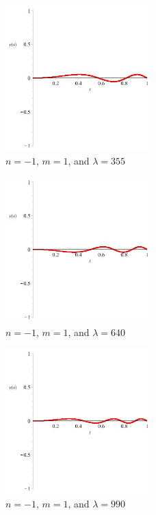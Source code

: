 \documentclass[executivepaper]{article}
\begin{document}
\begin{figure}[H]

\centering

\includegraphics[width=0.5\textwidth]{NEqualsNegative1MEquals1LambdaEquals355}

\caption{$n=-1$, $m=1$, and $\lambda=355$}

\end{figure}

\begin{figure}[H]

\centering

\includegraphics[width=0.5\textwidth]{NEqualsNegative1MEquals1LambdaEquals640}

\caption{$n=-1$, $m=1$, and $\lambda=640$}

\end{figure}

\vspace{5mm}

\begin{figure}[H]

\centering

\includegraphics[width=0.5\textwidth]{NEqualsNegative1MEquals1LambdaEquals990}

\caption{$n=-1$, $m=1$, and $\lambda=990$}

\end{figure}
\end{document}
